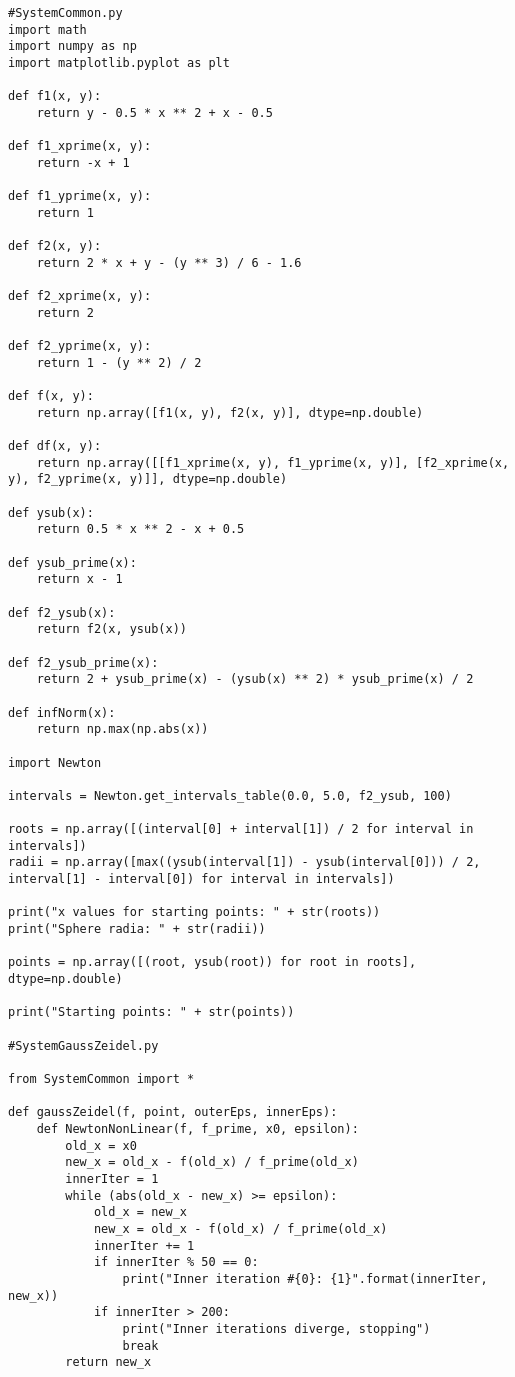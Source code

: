 \documentclass[14pt, a4paper]{article}
\begin{document}
\begin{lstlisting}
#SystemCommon.py
import math
import numpy as np
import matplotlib.pyplot as plt

def f1(x, y):
    return y - 0.5 * x ** 2 + x - 0.5

def f1_xprime(x, y):
    return -x + 1

def f1_yprime(x, y):
    return 1

def f2(x, y):
    return 2 * x + y - (y ** 3) / 6 - 1.6

def f2_xprime(x, y):
    return 2

def f2_yprime(x, y):
    return 1 - (y ** 2) / 2

def f(x, y):
    return np.array([f1(x, y), f2(x, y)], dtype=np.double)

def df(x, y):
    return np.array([[f1_xprime(x, y), f1_yprime(x, y)], [f2_xprime(x, y), f2_yprime(x, y)]], dtype=np.double)

def ysub(x):
    return 0.5 * x ** 2 - x + 0.5

def ysub_prime(x):
    return x - 1

def f2_ysub(x):
    return f2(x, ysub(x))

def f2_ysub_prime(x):
    return 2 + ysub_prime(x) - (ysub(x) ** 2) * ysub_prime(x) / 2

def infNorm(x):
    return np.max(np.abs(x))

import Newton

intervals = Newton.get_intervals_table(0.0, 5.0, f2_ysub, 100)

roots = np.array([(interval[0] + interval[1]) / 2 for interval in intervals])
radii = np.array([max((ysub(interval[1]) - ysub(interval[0])) / 2, interval[1] - interval[0]) for interval in intervals])

print("x values for starting points: " + str(roots))
print("Sphere radia: " + str(radii))

points = np.array([(root, ysub(root)) for root in roots], dtype=np.double)

print("Starting points: " + str(points))

#SystemGaussZeidel.py

from SystemCommon import *

def gaussZeidel(f, point, outerEps, innerEps):
    def NewtonNonLinear(f, f_prime, x0, epsilon):
        old_x = x0
        new_x = old_x - f(old_x) / f_prime(old_x)
        innerIter = 1
        while (abs(old_x - new_x) >= epsilon):
            old_x = new_x
            new_x = old_x - f(old_x) / f_prime(old_x)
            innerIter += 1
            if innerIter % 50 == 0:
                print("Inner iteration #{0}: {1}".format(innerIter, new_x))
            if innerIter > 200:
                print("Inner iterations diverge, stopping")
                break
        return new_x
    

\end{lstlisting}
\end{document}
